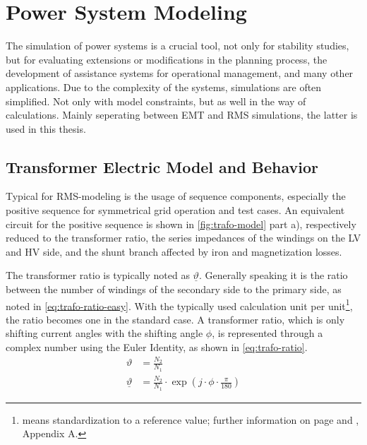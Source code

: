 \section{Power System Modeling}

The simulation of power systems is a crucial tool, not only for stability studies, but for evaluating extensions or modifications in the planning process, the development of assistance systems for operational management, and many other applications.
Due to the complexity of the systems, simulations are often simplified. 
Not only with model constraints, but as well in the way of calculations. 
Mainly seperating between \acf{EMT} and \acf{RMS} simulations, the latter is used in this thesis. 

\subsection{Transformer Electric Model and Behavior}
\label{sec:trafo-model}

Typical for \acs{RMS}-modeling is the usage of sequence components, especially the positive sequence for symmetrical grid operation and test cases.
An equivalent circuit for the positive sequence is shown in \autoref{fig:trafo-model} part a), respectively reduced to the transformer ratio, the series impedances of the windings on the \acs{LV} and \acs{HV} side, and the shunt branch affected by iron and magnetization losses. \autocite{machowski_2020,kundur_2022,milano_2010}

The transformer ratio is typically noted as $\underline{\vartheta}$. 
Generally speaking it is the ratio between the number of windings of the secondary side to the primary side, as noted in \autoref{eq:trafo-ratio-easy}. 
With the typically used calculation unit per unit\footnote{means standardization to a reference value; further information on page \pageref{chap:symbols} and \textcite{machowski_2020}, Appendix A.}, the ratio becomes one in the standard case. 
A transformer ratio, which is only shifting current angles with the shifting angle $\phi$, is represented through a complex number using the Euler Identity, as shown in \autoref{eq:trafo-ratio}.
\begin{align}
    \vartheta&=\frac{N_2}{N_1} \label{eq:trafo-ratio-easy} \\[6pt]
    \underline{\vartheta}&=\frac{N_2}{N_1} \cdot \exp(j \cdot \phi \cdot \frac{\pi}{180})\label{eq:trafo-ratio}
\end{align}

